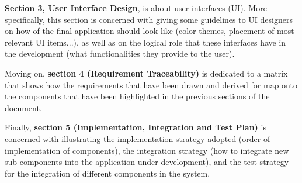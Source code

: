 \textbf{Section 3, User Interface Design}, is about user interfaces (UI). 
More specifically, this section is concerned with giving some guidelines to UI designers on how of the final application should look like (color themes, placement of most relevant UI items...), as well as on the logical role that these interfaces have in the development (what functionalities they provide to the user).

Moving on, \textbf{section 4 (Requirement Traceability)} is dedicated to a matrix that shows how the requirements that have been drawn and derived for \app map onto the components that have been highlighted in the previous sections of the document.

Finally, \textbf{section 5 (Implementation, Integration and Test Plan)} is concerned with illustrating the implementation strategy adopted (order of implementation of components), the integration strategy (how to integrate new sub-components into the application under-development), and the test strategy for the integration of different components in the system.